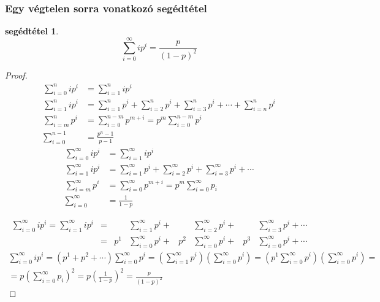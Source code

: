 \documentclass{article}
\newtheorem{lemm}{segédtétel}
\newcommand{\parenthesed}[1]{\left(#1\right)}
\begin{document}
	\subsubsection{Egy végtelen sorra vonatkozó segédtétel}
	\begin{lemm}
		\begin{equation}
			\sum_{i=0}^\infty ip^i = \frac p {\parenthesed{1-p}^2}
		\end{equation}
	\end{lemm}
	\begin{proof}
		\begin{align}
			\sum_{i=0}^n ip^i &= \sum_{i=1}^n ip^i\\
			\sum_{i=1}^n ip^i &= \sum_{i=1}^n p^i + \sum_{i=2}^n p^i + \sum_{i=3}^n p^i + \cdots + \sum_{i=n}^n p^i\\
			\sum_{i=m}^n p^i        &= \sum_{i=0}^{n-m} p^{m+i} = p^m \sum_{i=0}^{n-m}p^i\\
			\sum_{i=0}^{n-1}        &= \frac{p^n-1}{p-1}
		\end{align}
		\begin{align}
			\sum_{i=0}^\infty ip^i &= \sum_{i=1}^\infty ip^i\\
			\sum_{i=1}^\infty ip^i &= \sum_{i=1}^\infty p^i + \sum_{i=2}^\infty p^i + \sum_{i=3}^\infty p^i + \cdots\\
			\sum_{i=m}^\infty p^i  &= \sum_{i=0}^\infty p^{m+i} = p^m\sum_{i=0}^\infty p_i\\
			\sum_{i=0}^\infty      &= \frac1{1-p}
		\end{align}
		\begin{comment}
			\begin{align}
				\sum_{i=0}^\infty ip^i = \sum_{i=1}^\infty ip^i &= &  &    & &\sum_{i=1}^\infty p^i + {} &    &\sum_{i=2}^\infty p^i + {} &    &\sum_{i=3}^\infty p^i + \cdots\\
							                        &= &  &p^1 & &\sum_{i=0}^\infty p^i + {} & p^2&\sum_{i=0}^\infty p^i + {} & p^3&\sum_{i=0}^\infty p^i + \cdots\\
							                        &= & (&p^1 & &{}                    + {} & &p^2&{} + &p^3 + \cdots)\sum
			\end{align}
		\end{comment}
		\begin{align}
			\sum_{i=0}^\infty ip^i = \sum_{i=1}^\infty ip^i &= &    &\sum_{i=1}^\infty p^i + {} &    &\sum_{i=2}^\infty p^i + {} &    &\sum_{i=3}^\infty p^i + \cdots\\
					                                &= & p^1&\sum_{i=0}^\infty p^i + {} & p^2&\sum_{i=0}^\infty p^i + {} & p^3&\sum_{i=0}^\infty p^i + \cdots
		\end{align}
		\begin{multline}
			\sum_{i=0}^\infty ip^i = \parenthesed{p^1 + p^2 + \cdots}\sum_{i=0}^\infty p^i = \parenthesed{\sum_{i=1}^\infty p^i} \parenthesed{\sum_{i=0}^\infty p^i} = \parenthesed{p^1\sum_{i=0}^\infty p^i} \parenthesed{\sum_{i=0}^\infty p^i}=\\
			= p\parenthesed{\sum_{i=0}^\infty p_i}^2 = p\parenthesed{\frac1{1-p}}^2 = \frac p{\parenthesed{1-p}^2}
		\end{multline}
	\end{proof}
\end{document}
